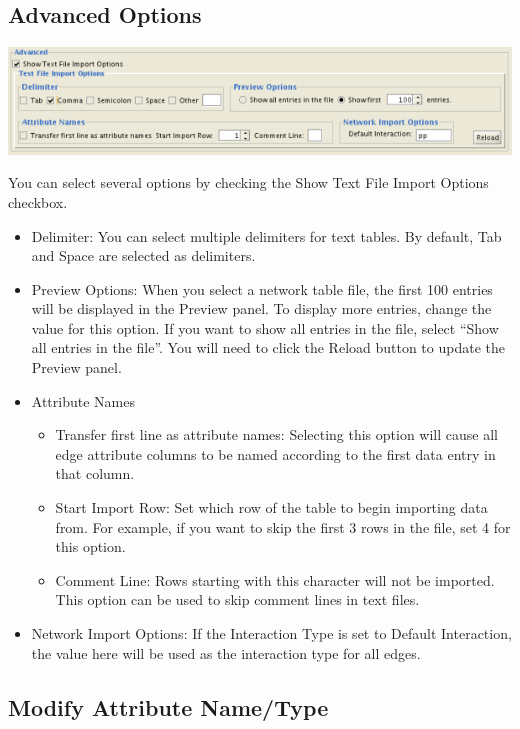 \subsection{Advanced Options}
\begin{center}
 \includegraphics[width=\textwidth]{images/network_import_advanced.png} 
\end{center}

 You can select several options by checking the Show Text File Import Options checkbox. 
\begin{itemize}
\item Delimiter: You can select multiple delimiters for text tables. By default, Tab and Space are selected as delimiters. 
\item Preview Options: When you select a network table file, the first 100 entries will be displayed in the Preview panel. To display more entries, change the value for this option. If you want to show all entries in the file, select ``Show all entries in the file''. You will need to click the Reload button to update the Preview panel. 
\item Attribute Names \begin{itemize}
\item Transfer first line as attribute names: Selecting this option will cause all edge attribute columns to be named according to the first data entry in that column. 
\item Start Import Row: Set which row of the table to begin importing data from. For example, if you want to skip the first 3 rows in the file, set 4 for this option. 
\item Comment Line: Rows starting with this character will not be imported. This option can be used to skip comment lines in text files. 
\end{itemize}
\item Network Import Options: If the Interaction Type is set to Default Interaction, the value here will be used as the interaction type for all edges. 
\end{itemize}
 
\subsection{Modify Attribute Name/Type}

